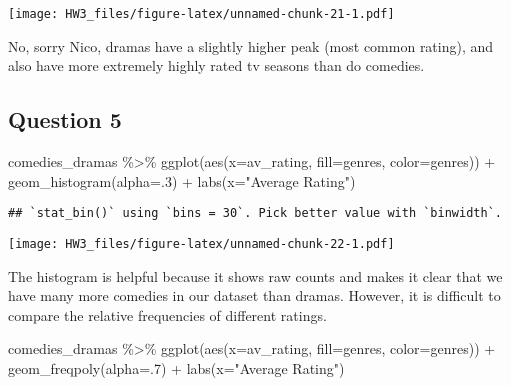 \documentclass[
]{article}
\newenvironment{Shaded}{\begin{snugshade}}{\end{snugshade}}
\newcommand{\AttributeTok}[1]{\textcolor[rgb]{0.77,0.63,0.00}{#1}}
\newcommand{\DecValTok}[1]{\textcolor[rgb]{0.00,0.00,0.81}{#1}}
\newcommand{\FunctionTok}[1]{\textcolor[rgb]{0.00,0.00,0.00}{#1}}
\newcommand{\NormalTok}[1]{#1}
\newcommand{\SpecialCharTok}[1]{\textcolor[rgb]{0.00,0.00,0.00}{#1}}
\newcommand{\StringTok}[1]{\textcolor[rgb]{0.31,0.60,0.02}{#1}}
\begin{document}
\texttt{[image: HW3\_files/figure-latex/unnamed-chunk-21-1.pdf]}

No, sorry Nico, dramas have a slightly higher peak (most common rating),
and also have more extremely highly rated tv seasons than do comedies.

\hypertarget{question-5-1}{%
\subsection{Question 5}\label{question-5-1}}

\begin{Shaded}
\begin{Highlighting}[]
\NormalTok{comedies\_dramas }\SpecialCharTok{\%\textgreater{}\%} 
  \FunctionTok{ggplot}\NormalTok{(}\FunctionTok{aes}\NormalTok{(}\AttributeTok{x=}\NormalTok{av\_rating,}
             \AttributeTok{fill=}\NormalTok{genres,}
             \AttributeTok{color=}\NormalTok{genres)) }\SpecialCharTok{+}
  \FunctionTok{geom\_histogram}\NormalTok{(}\AttributeTok{alpha=}\NormalTok{.}\DecValTok{3}\NormalTok{) }\SpecialCharTok{+}
  \FunctionTok{labs}\NormalTok{(}\AttributeTok{x=}\StringTok{"Average Rating"}\NormalTok{)}
\end{Highlighting}
\end{Shaded}

\begin{verbatim}
## `stat_bin()` using `bins = 30`. Pick better value with `binwidth`.
\end{verbatim}

\texttt{[image: HW3\_files/figure-latex/unnamed-chunk-22-1.pdf]}

The histogram is helpful because it shows raw counts and makes it clear
that we have many more comedies in our dataset than dramas. However, it
is difficult to compare the relative frequencies of different ratings.

\begin{Shaded}
\begin{Highlighting}[]
\NormalTok{comedies\_dramas }\SpecialCharTok{\%\textgreater{}\%} 
  \FunctionTok{ggplot}\NormalTok{(}\FunctionTok{aes}\NormalTok{(}\AttributeTok{x=}\NormalTok{av\_rating,}
             \AttributeTok{fill=}\NormalTok{genres,}
             \AttributeTok{color=}\NormalTok{genres)) }\SpecialCharTok{+}
  \FunctionTok{geom\_freqpoly}\NormalTok{(}\AttributeTok{alpha=}\NormalTok{.}\DecValTok{7}\NormalTok{) }\SpecialCharTok{+}
  \FunctionTok{labs}\NormalTok{(}\AttributeTok{x=}\StringTok{"Average Rating"}\NormalTok{)}
\end{Highlighting}
\end{Shaded}
\end{document}
